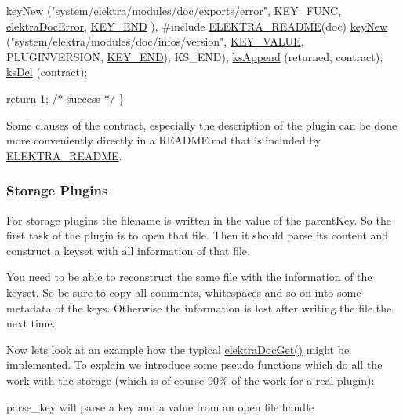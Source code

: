 \begin{DoxyCodeInclude}
                \hyperlink{group__key_gad23c65b44bf48d773759e1f9a4d43b89}{keyNew} (\textcolor{stringliteral}{"system/elektra/modules/doc/exports/error"},
                        KEY\_FUNC, \hyperlink{group__plugin_gad74b35f558ac7c3262f6069c5c47dc79}{elektraDocError}, \hyperlink{group__key_gga91fb3178848bd682000958089abbaf40aa8adb6fcb92dec58fb19410eacfdd403}{KEY\_END}
      ),
#include \hyperlink{group__plugin_ga78d616f68bf9fb0942f66478597467c6}{ELEKTRA\_README}(doc)
                \hyperlink{group__key_gad23c65b44bf48d773759e1f9a4d43b89}{keyNew} (\textcolor{stringliteral}{"system/elektra/modules/doc/infos/version"},
                        \hyperlink{group__key_gga91fb3178848bd682000958089abbaf40ac66e4a49d09212b79f5754ca6db5bd2e}{KEY\_VALUE}, PLUGINVERSION, \hyperlink{group__key_gga91fb3178848bd682000958089abbaf40aa8adb6fcb92dec58fb19410eacfdd403}{KEY\_END}),
                KS\_END);
                \hyperlink{group__keyset_ga21eb9c3a14a604ee3a8bdc779232e7b7}{ksAppend} (returned, contract);
                \hyperlink{group__keyset_ga27e5c16473b02a422238c8d970db7ac8}{ksDel} (contract);

                \textcolor{keywordflow}{return} 1; \textcolor{comment}{/* success */}
        \}
\end{DoxyCodeInclude}
 Some clauses of the contract, especially the description of the plugin can be done more conveniently directly in a R\-E\-A\-D\-M\-E.\-md that is included by \hyperlink{group__plugin_ga78d616f68bf9fb0942f66478597467c6}{E\-L\-E\-K\-T\-R\-A\-\_\-\-R\-E\-A\-D\-M\-E}.\hypertarget{group__plugin_storage}{}\subsubsection{Storage Plugins}\label{group__plugin_storage}
For storage plugins the filename is written in the value of the parent\-Key. So the first task of the plugin is to open that file. Then it should parse its content and construct a keyset with all information of that file.

You need to be able to reconstruct the same file with the information of the keyset. So be sure to copy all comments, whitespaces and so on into some metadata of the keys. Otherwise the information is lost after writing the file the next time.

Now lets look at an example how the typical \hyperlink{group__plugin_gacb69f3441c6d84241b4362f958fbe313}{elektra\-Doc\-Get()} might be implemented. To explain we introduce some pseudo functions which do all the work with the storage (which is of course 90\% of the work for a real plugin)\-:
\begin{DoxyItemize}
\item parse\-\_\-key will parse a key and a value from an open file handle
\end{DoxyItemize}

